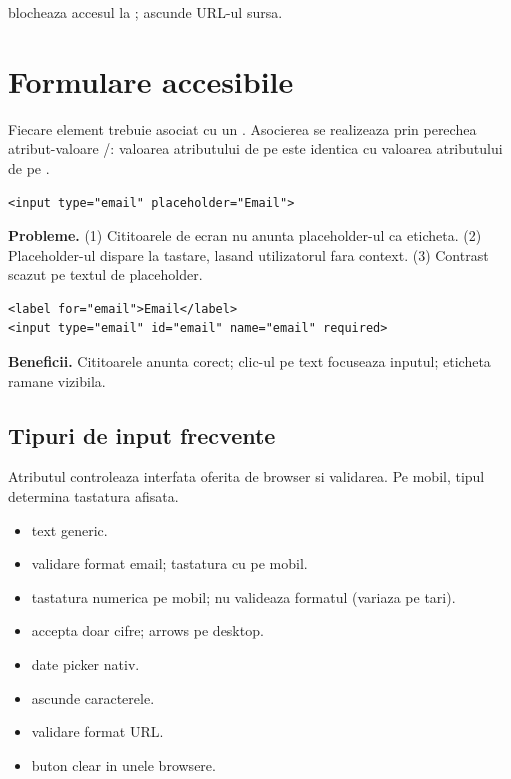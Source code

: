  blocheaza accesul la ;  ascunde URL-ul sursa.

\section{Formulare accesibile}

Fiecare element  trebuie asociat cu un . Asocierea se realizeaza prin perechea atribut-valoare /: valoarea atributului  de pe  este identica cu valoarea atributului  de pe .

\begin{dano}
\begin{lstlisting}[style=html, numbers=none]
<input type="email" placeholder="Email">
\end{lstlisting}
\textbf{Probleme.} (1) Cititoarele de ecran nu anunta placeholder-ul ca eticheta. (2) Placeholder-ul dispare la tastare, lasand utilizatorul fara context. (3) Contrast scazut pe textul de placeholder.
\end{dano}

\begin{dado}[Asa da]
\begin{lstlisting}[style=html, numbers=none]
<label for="email">Email</label>
<input type="email" id="email" name="email" required>
\end{lstlisting}
\textbf{Beneficii.} Cititoarele anunta corect; clic-ul pe text focuseaza inputul; eticheta ramane vizibila.
\end{dado}

\subsection{Tipuri de input frecvente}

Atributul  controleaza interfata oferita de browser si validarea. Pe mobil, tipul determina tastatura afisata.

\begin{itemize}[itemsep=2pt]
  \item {} \textendash{} text generic.
  \item {} \textendash{} validare format email; tastatura cu  pe mobil.
  \item {} \textendash{} tastatura numerica pe mobil; nu valideaza formatul (variaza pe tari).
  \item {} \textendash{} accepta doar cifre; arrows pe desktop.
  \item {} \textendash{} date picker nativ.
  \item {} \textendash{} ascunde caracterele.
  \item {} \textendash{} validare format URL.
  \item {} \textendash{} buton clear in unele browsere.
\end{itemize}

